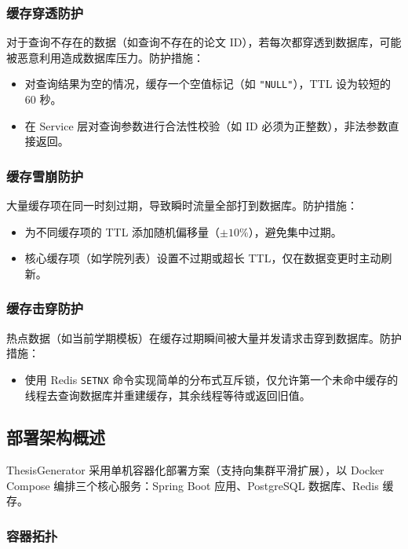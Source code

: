 \documentclass{../../softeng}
\begin{document}
\subsubsection{缓存穿透防护}

对于查询不存在的数据（如查询不存在的论文 ID），若每次都穿透到数据库，可能被恶意利用造成数据库压力。防护措施：
\begin{itemize}
    \item 对查询结果为空的情况，缓存一个空值标记（如 \texttt{"NULL"}），TTL 设为较短的 60 秒。
    \item 在 Service 层对查询参数进行合法性校验（如 ID 必须为正整数），非法参数直接返回。
\end{itemize}

\subsubsection{缓存雪崩防护}

大量缓存项在同一时刻过期，导致瞬时流量全部打到数据库。防护措施：
\begin{itemize}
    \item 为不同缓存项的 TTL 添加随机偏移量（$\pm 10\%$），避免集中过期。
    \item 核心缓存项（如学院列表）设置不过期或超长 TTL，仅在数据变更时主动刷新。
\end{itemize}

\subsubsection{缓存击穿防护}

热点数据（如当前学期模板）在缓存过期瞬间被大量并发请求击穿到数据库。防护措施：
\begin{itemize}
    \item 使用 Redis \texttt{SETNX} 命令实现简单的分布式互斥锁，仅允许第一个未命中缓存的线程去查询数据库并重建缓存，其余线程等待或返回旧值。
\end{itemize}

\subsection{部署架构概述}

ThesisGenerator 采用单机容器化部署方案（支持向集群平滑扩展），以 Docker Compose 编排三个核心服务：Spring Boot 应用、PostgreSQL 数据库、Redis 缓存。

\subsubsection{容器拓扑}
\end{document}
